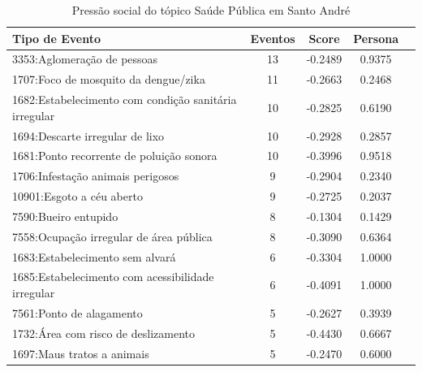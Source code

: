 \begin{table}[htbp]
	\centering
	\caption{Pressão social do tópico Saúde Pública em Santo André}
	\label{tab:eventos_populares_sa}
	\begin{tabular}{|l|c|c|c|c|}
		\hline
		\textbf{Tipo de Evento}                               & \textbf{Eventos} & \textbf{Score} & \textbf{Persona} \\
		\hline
		3353:Aglomeração de pessoas                           & 13               & -0.2489        & 0.9375           \\
		\hline
		1707:Foco de mosquito da dengue/zika                  & 11               & -0.2663        & 0.2468           \\
		\hline
		1682:Estabelecimento com condição sanitária irregular & 10               & -0.2825        & 0.6190           \\
		\hline
		1694:Descarte irregular de lixo                       & 10               & -0.2928        & 0.2857           \\
		\hline
		1681:Ponto recorrente de poluição sonora              & 10               & -0.3996        & 0.9518           \\
		\hline
		1706:Infestação animais perigosos                     & 9                & -0.2904        & 0.2340           \\
		\hline
		10901:Esgoto a céu aberto                             & 9                & -0.2725        & 0.2037           \\
		\hline
		7590:Bueiro entupido                                  & 8                & -0.1304        & 0.1429           \\
		\hline
		7558:Ocupação irregular de área pública               & 8                & -0.3090        & 0.6364           \\
		\hline
		1683:Estabelecimento sem alvará                       & 6                & -0.3304        & 1.0000           \\
		\hline
		1685:Estabelecimento com acessibilidade irregular     & 6                & -0.4091        & 1.0000           \\
		\hline
		7561:Ponto de alagamento                              & 5                & -0.2627        & 0.3939           \\
		\hline
		1732:Área com risco de deslizamento                   & 5                & -0.4430        & 0.6667           \\
		\hline
		1697:Maus tratos a animais                            & 5                & -0.2470        & 0.6000           \\

\end{tabular}
\end{table}
